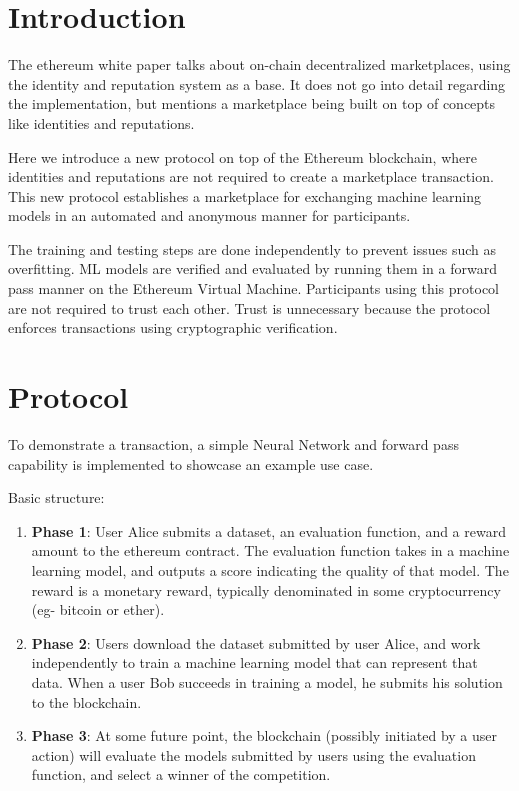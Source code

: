 \documentclass{article}
\begin{document}
\section{Introduction}
The ethereum white paper talks about on-chain decentralized marketplaces, using the identity and reputation system as a base. It does not go into detail regarding the implementation, but mentions a marketplace being built on top of concepts like identities and reputations. \cite{eth_paper}

Here we introduce a new protocol on top of the Ethereum blockchain, where identities and reputations are not required to create a marketplace transaction. This new protocol establishes a marketplace for exchanging machine learning models in an automated and anonymous manner for participants.

The training and testing steps are done independently to prevent issues such as overfitting. ML models are verified and evaluated by running them in a forward pass manner on the Ethereum Virtual Machine. Participants using this protocol are not required to trust each other. Trust is unnecessary because the protocol enforces transactions using cryptographic verification.

\section{Protocol}
\label{protocol}

To demonstrate a transaction, a simple Neural Network and forward pass capability is implemented to showcase an example use case.

Basic structure:

\begin{enumerate}
\item \textbf{Phase 1}: User Alice submits a dataset, an evaluation function, and a reward amount to the ethereum contract. The evaluation function takes in a machine learning model, and outputs a score indicating the quality of that model. The reward is a monetary reward, typically denominated in some cryptocurrency (eg- bitcoin or ether).
\item \textbf{Phase 2}: Users download the dataset submitted by user Alice, and work independently to train a machine learning model that can represent that data. When a user Bob succeeds in training a model, he submits his solution to the blockchain.
\item \textbf{Phase 3}: At some future point, the blockchain (possibly initiated by a user action) will evaluate the models submitted by users using the evaluation function, and select a winner of the competition.
\end{enumerate}
\end{document}
